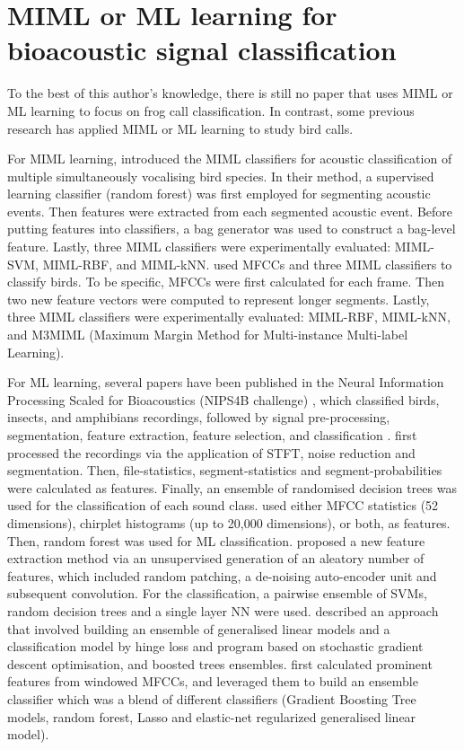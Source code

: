 \section{MIML or ML learning for bioacoustic signal classification}
To the best of this author's knowledge, there is still no paper that uses MIML or ML learning to focus on frog call classification. In contrast, some previous research has applied MIML or ML learning to study bird calls.

For MIML learning, \citet{briggs2012acoustic} introduced the MIML classifiers for acoustic classification of multiple simultaneously vocalising bird species. In their method, a supervised learning classifier (random forest) was first employed for segmenting acoustic events. Then features were extracted from each segmented acoustic event. Before putting features into classifiers, a bag generator was used to construct a bag-level feature. Lastly, three MIML classifiers were experimentally evaluated: MIML-SVM, MIML-RBF, and MIML-kNN.
\citet{dufour2013multi} used MFCCs and three MIML classifiers to classify birds. To be specific, MFCCs were first calculated for each frame. Then two new feature vectors were computed to represent longer segments.
Lastly, three MIML classifiers were experimentally evaluated: MIML-RBF, MIML-kNN, and M3MIML (Maximum Margin Method for Multi-instance Multi-label Learning). 

For ML learning, several papers have been published in the Neural Information Processing Scaled for Bioacoustics (NIPS4B challenge) \citep{glotinneural}, which classified birds, insects, and amphibians recordings, followed by signal pre-processing, segmentation, feature extraction, feature selection, and classification \citep{lasseck2013bird, stowell2013feature, mencia2013learning, massaronensemble, chen2013novel}. \citet{lasseck2013bird} first processed the recordings via the application of STFT, noise reduction and segmentation. Then, file-statistics, segment-statistics and segment-probabilities were calculated as  features. Finally, an ensemble of randomised decision trees was used for the classification of each sound class. \citet{stowell2013feature} used either MFCC statistics (52 dimensions), chirplet histograms (up to 20,000 dimensions), or both, as features. Then, random forest was used for ML classification. \citet{mencia2013learning} proposed a new feature extraction method via an unsupervised generation of an aleatory number of features, which included random patching, a de-noising auto-encoder unit and subsequent convolution. For the classification, a pairwise ensemble of SVMs, random decision trees and a single layer NN were used. \citet{massaronensemble} described an approach that involved building an ensemble of generalised linear models and a classification model by hinge loss and program based on stochastic gradient descent optimisation, and boosted trees ensembles. 
\citet{chen2013novel} first calculated prominent features from windowed MFCCs, and leveraged them to build an ensemble classifier which was a blend of different classifiers (Gradient Boosting Tree models, random forest, Lasso and elastic-net regularized generalised linear model).




